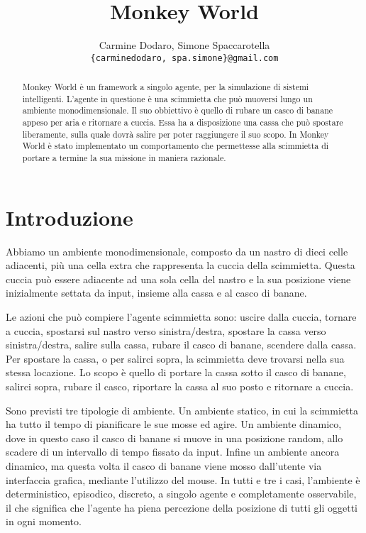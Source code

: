 \documentclass[a4paper,10pt]{article}
\title{Monkey World}
\author{
    Carmine Dodaro, Simone Spaccarotella \\
    \texttt{\{carminedodaro, spa.simone\}@gmail.com}
}
\begin{document}
    \maketitle

    \begin{abstract}
	Monkey World è un framework a singolo agente, per la simulazione di sistemi intelligenti. L'agente
	in questione è una scimmietta che può muoversi lungo un ambiente monodimensionale. Il suo obbiettivo è quello di rubare un
	casco di banane appeso per aria e ritornare a cuccia. Essa ha a disposizione una cassa che può spostare liberamente, sulla quale dovrà salire per poter
	raggiungere il suo scopo. In Monkey World è stato implementato un comportamento che permettesse alla scimmietta di portare a termine
	la sua missione in maniera razionale.
    \end{abstract}

    \section{Introduzione}
	Abbiamo un ambiente monodimensionale, composto da un nastro di dieci celle adiacenti, più una cella extra che
	rappresenta la cuccia della scimmietta. Questa cuccia può essere adiacente ad una sola cella del nastro e la sua
	posizione viene inizialmente settata da input, insieme alla cassa e al casco di banane.
	
	Le azioni che può compiere l'agente scimmietta sono: uscire dalla cuccia, tornare a cuccia,
	spostarsi sul nastro verso sinistra/destra, spostare la cassa verso sinistra/destra, salire sulla cassa,
	rubare il casco di banane, scendere dalla cassa. Per spostare la cassa, o per salirci sopra, la scimmietta deve trovarsi
	nella sua stessa locazione. Lo scopo è quello di portare la cassa sotto il casco di banane, salirci sopra, rubare il casco, 
	riportare la cassa al suo posto e ritornare a cuccia.
	
	Sono previsti tre tipologie di ambiente. Un ambiente statico, in cui la scimmietta ha tutto il tempo di pianificare le sue mosse
	ed agire. Un ambiente dinamico, dove in questo caso il casco di banane si muove in una posizione random, allo scadere di un intervallo di tempo fissato
	da input. Infine un ambiente ancora dinamico, ma questa volta il casco di banane viene mosso dall'utente via interfaccia grafica, mediante
	l'utilizzo del mouse. In tutti e tre i casi, l'ambiente è deterministico, episodico, discreto, a singolo agente e completamente osservabile,
	il che significa che l'agente ha piena percezione della posizione di tutti gli oggetti in ogni momento.
	
\end{document}
